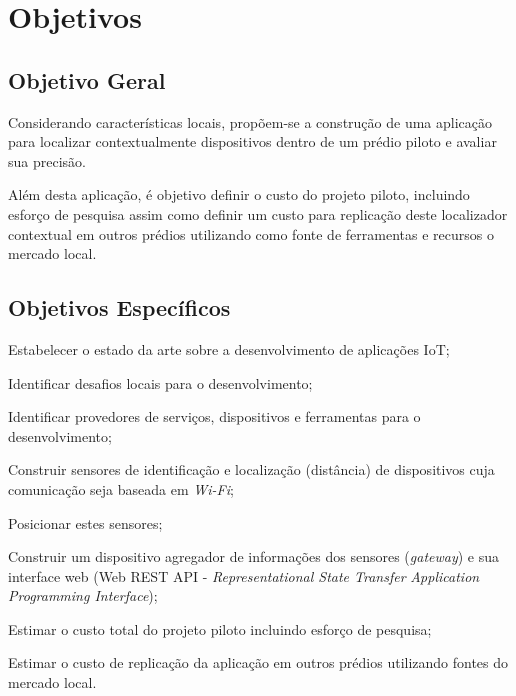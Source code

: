 
\section{Objetivos}
\label{sec:Objetivos}

\subsection{Objetivo Geral}
\label{subsec:Objetivo Geral}

Considerando características locais, propõem-se a construção de uma aplicação
para localizar contextualmente dispositivos dentro de um prédio piloto e avaliar
sua precisão.

Além desta aplicação, é objetivo definir o custo do projeto piloto, incluindo
esforço de pesquisa assim como definir um custo para replicação deste
localizador contextual em outros prédios utilizando como fonte de ferramentas e
recursos o mercado local.

\subsection{Objetivos Específicos}
\label{subsec:Objetivos Específicos}

\begin{alineas}

	\item Estabelecer o estado da arte sobre a desenvolvimento de aplicações IoT;

	\item Identificar desafios locais para o desenvolvimento;

	\item Identificar provedores de serviços, dispositivos e ferramentas para o
desenvolvimento;

	\item Construir sensores de identificação e localização (distância) de
 dispositivos cuja comunicação seja baseada em \emph{Wi-Fi};

	\item Posicionar estes sensores;

	\item Construir um dispositivo agregador de informações dos sensores
 (\emph{gateway}) e sua interface web (Web REST API - \emph{Representational
State Transfer} \emph{Application Programming Interface});

	\item Estimar o custo total do projeto piloto incluindo esforço de pesquisa;

	\item Estimar o custo de replicação da aplicação em outros prédios
	utilizando fontes do mercado local.

\end{alineas}
